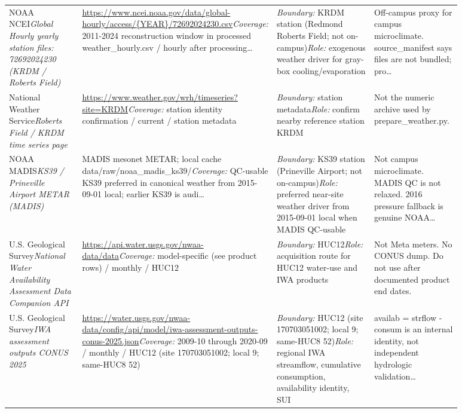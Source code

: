 \documentclass[11pt]{article}
\begin{document}
\begin{longtable}{@{}p{0.18\linewidth}p{0.25\linewidth}p{0.25\linewidth}p{0.20\linewidth}@{}}
NOAA NCEI\newline \textit{Global Hourly yearly station files: 72692024230 (KRDM / Roberts Field)} & \url{https://www.ncei.noaa.gov/data/global-hourly/access/{YEAR}/72692024230.csv}\newline \textit{Coverage:} 2011-2024 reconstruction window in processed weather\_hourly.csv / hourly after processing\ldots & \textit{Boundary:} KRDM station (Redmond Roberts Field; not on-campus)\newline \textit{Role:} exogenous weather driver for gray-box cooling/evaporation & Off-campus proxy for campus microclimate. source\_manifest says files are not bundled; pro\ldots\\
National Weather Service\newline \textit{Roberts Field / KRDM time series page} & \url{https://www.weather.gov/wrh/timeseries?site=KRDM}\newline \textit{Coverage:} station identity confirmation / current / station metadata & \textit{Boundary:} station metadata\newline \textit{Role:} confirm nearby reference station KRDM & Not the numeric archive used by prepare\_weather.py.\\
NOAA MADIS\newline \textit{KS39 / Prineville Airport METAR (MADIS)} & MADIS mesonet METAR; local cache data/raw/noaa\_madis\_ks39/\newline \textit{Coverage:} QC-usable KS39 preferred in canonical weather from 2015-09-01 local; earlier KS39 is audi\ldots & \textit{Boundary:} KS39 station (Prineville Airport; not on-campus)\newline \textit{Role:} preferred near-site weather driver from 2015-09-01 local when MADIS QC-usable & Not campus microclimate. MADIS QC is not relaxed. 2016 pressure fallback is genuine NOAA\ldots\\
U.S. Geological Survey\newline \textit{National Water Availability Assessment Data Companion API} & \url{https://api.water.usgs.gov/nwaa-data/data}\newline \textit{Coverage:} model-specific (see product rows) / monthly / HUC12 & \textit{Boundary:} HUC12\newline \textit{Role:} acquisition route for HUC12 water-use and IWA products & Not Meta meters. No CONUS dump. Do not use after documented product end dates.\\
U.S. Geological Survey\newline \textit{IWA assessment outputs CONUS 2025} & \url{https://water.usgs.gov/nwaa-data/config/api/model/iwa-assessment-outputs-conus-2025.json}\newline \textit{Coverage:} 2009-10 through 2020-09 / monthly / HUC12 (site 170703051002; local 9; same-HUC8 52) & \textit{Boundary:} HUC12 (site 170703051002; local 9; same-HUC8 52)\newline \textit{Role:} regional IWA streamflow, cumulative consumption, availability identity, SUI & availab = strflow - consum is an internal identity, not independent hydrologic validation\ldots\\

\end{longtable}
\end{document}
